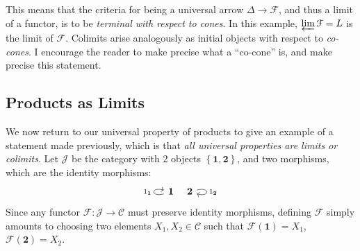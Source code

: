This means that the criteria for being a universal arrow $\Delta \to \mathcal{F} $, and thus a limit of a functor, is to be \emph{terminal with respect to cones}. In this example, $\varprojlim \mathcal{F} =L$ is the limit of $\mathcal{F} $. Colimits arise analogously as initial objects with respect to \emph{co-cones}. I encourage the reader to make precise what a ``co-cone'' is, and make precise this statement.

\subsection{Products as Limits}

We now return to our universal property of products to give an example of a statement made previously, which is that \emph{all universal properties are limits or colimits}. Let $\mathcal{J} $ be the category with 2 objects $\left\{ \mathbf{1} ,\mathbf{2}  \right\} $, and two morphisms, which are the identity morphisms:
\[\begin{tikzcd}[row sep = 2.5em, column sep = 0.5em]
\mathbf{1} \ar[loop left, "1_{\mathbf{1} } "]  & \mathbf{2} \ar[" 1_{\mathbf{2} }  ", loop right] 
\end{tikzcd}\]
Since any functor $\mathcal{F} : \mathcal{J}  \to \mathcal{C} $ must preserve identity morphisms, defining $\mathcal{F} $ simply amounts to choosing two elements $X_1,X_2\in \mathcal{C} $ such that $\mathcal{F} (\mathbf{1} )=X_1$, $\mathcal{F} (\mathbf{2} )=X_2$.

